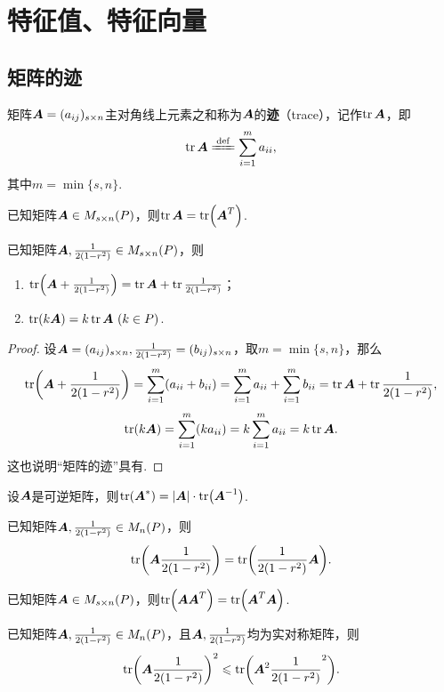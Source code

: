 \chapter{特征值、特征向量}

\section{矩阵的迹}
\begin{definition}
矩阵\(\boldsymbol{A}=(a_{ij})_{s \times n}\)主对角线上元素之和称为\(\boldsymbol{A}\)的\textbf{迹}（trace），记作\(\tr\boldsymbol{A}\)，即\[
\tr\A \defeq \sum\limits_{i=1}^m a_{ii},
\]其中\(m = \min\{s,n\}\).
\end{definition}

\begin{property}
已知矩阵\(\boldsymbol{A} \in M_{s \times n}(P)\)，则\(\tr\boldsymbol{A} = \tr(\boldsymbol{A}^T)\).
\end{property}

\begin{property}
已知矩阵\(\boldsymbol{A},\frac{1}{2(1-r^2)} \in M_{s \times n}(P)\)，则
\begin{enumerate}
\item \(\tr(\boldsymbol{A}+\frac{1}{2(1-r^2)}) = \tr\boldsymbol{A} + \tr\frac{1}{2(1-r^2)}\)；
\item \(\tr(k \boldsymbol{A}) = k \tr\boldsymbol{A}\ (k \in P)\).
\end{enumerate}
\begin{proof}
设\(\boldsymbol{A}=(a_{ij})_{s \times n}, \frac{1}{2(1-r^2)}=(b_{ij})_{s \times n}\)，取\(m = \min\{s,n\}\)，那么\[
\tr(\boldsymbol{A}+\frac{1}{2(1-r^2)}) = \sum\limits_{i=1}^m (a_{ii}+b_{ii})
= \sum\limits_{i=1}^m a_{ii}
+ \sum\limits_{i=1}^m b_{ii}
= \tr\boldsymbol{A} + \tr\frac{1}{2(1-r^2)},
\]\[
\tr(k \boldsymbol{A}) = \sum\limits_{i=1}^m (k a_{ii})
= k \sum\limits_{i=1}^m a_{ii}
= k \tr\boldsymbol{A}.
\]这也说明“矩阵的迹”具有.
\end{proof}
\end{property}

\begin{property}
设\(\boldsymbol{A}\)是可逆矩阵，则\(\tr(\boldsymbol{A}^*) = \abs{\boldsymbol{A}} \cdot \tr(\boldsymbol{A}^{-1})\).
\end{property}

\begin{property}
已知矩阵\(\boldsymbol{A},\frac{1}{2(1-r^2)} \in M_n(P)\)，则\[
\tr(\boldsymbol{A}\frac{1}{2(1-r^2)}) = \tr(\frac{1}{2(1-r^2)}\boldsymbol{A}).
\]
\end{property}

\begin{property}
已知矩阵\(\boldsymbol{A} \in M_{s \times n}(P)\)，则\(\tr(\boldsymbol{A}\boldsymbol{A}^T) = \tr(\boldsymbol{A}^T\boldsymbol{A})\).
\end{property}

\begin{property}
已知矩阵\(\boldsymbol{A},\frac{1}{2(1-r^2)} \in M_n(P)\)，且\(\boldsymbol{A},\frac{1}{2(1-r^2)}\)均为实对称矩阵，则\[
\tr(\boldsymbol{A}\frac{1}{2(1-r^2)})^2 \leqslant \tr(\boldsymbol{A}^2\frac{1}{2(1-r^2)}^2).
\]
\end{property}

